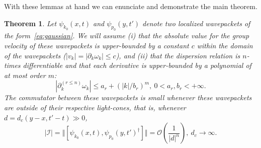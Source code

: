 \documentclass[notitlepage, prx, preprint, amsmath,superscriptaddress,amssymb]{revtex4-1}
\newtheorem{theorem}{Theorem}[section]
\begin{document}
With these lemmas at hand we can enunciate and demonstrate the main theorem.

\begin{theorem}
\label{th:free-causality}
Let $\psi_{k_0}(x,t)$ and $\psi_{p_0}(y,t')$ denote two localized wavepackets of the form\ \eqref{eq:gaussian}. We will assume (i) that the  absolute value for the group velocity of these wavepackets is upper-bounded by a constant $c$ within the domain of the wavepackets ($ |v_k| = |\partial_k \omega_k |  \leq c$), and (ii) that the dispersion relation is $n$-times differentiable and that each derivative is upper-bounded by a polynomial of at most order $m$:
\begin{equation}
|\partial^{(r\leq n)}_k\omega_k|\leq a_r + (|k|/b_r)^m,~0< a_r,b_r<+\infty.
\end{equation}
The commutator between these wavepackets is small whenever these wavepackets are outside of their respective light-cones, that is, whenever $d=d_c(y-x,t'-t)\gg 0$, 
\begin{equation}\label{eq:th_free_causality}
|\mathcal{I}|=\Vert[\psi_{k_0}(x,t),\psi_{p_0}(y,t')^\dagger]\Vert =
\mathcal{O}\left(\frac{1}{|d|^n}\right),~d_c\to\infty.
\end{equation}
\end{theorem}
\end{document}
